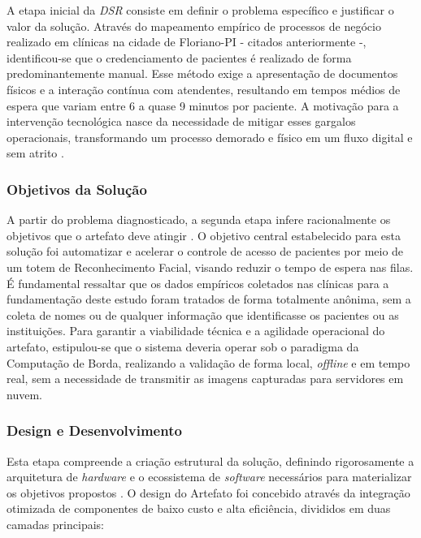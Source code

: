 A etapa inicial da \textit{DSR} consiste em definir o problema específico e justificar o valor da solução. Através do mapeamento empírico de processos de negócio realizado em clínicas na cidade de Floriano-PI - citados anteriormente -, identificou-se que o credenciamento de pacientes é realizado de forma predominantemente manual. Esse método exige a apresentação de documentos físicos e a interação contínua com atendentes, resultando em tempos médios de espera que variam entre 6 a quase 9 minutos por paciente. A motivação para a intervenção tecnológica nasce da necessidade de mitigar esses gargalos operacionais, transformando um processo demorado e físico em um fluxo digital e sem atrito \cite{peffers2007design}.

\subsubsection{Objetivos da Solução}
\label{subsubsec:objetivos-solução}

A partir do problema diagnosticado, a segunda etapa infere racionalmente os objetivos que o artefato deve atingir . O objetivo central estabelecido para esta solução foi automatizar e acelerar o controle de acesso de pacientes por meio de um totem de Reconhecimento Facial, visando reduzir o tempo de espera nas filas. É fundamental ressaltar que os dados empíricos coletados nas clínicas para a fundamentação deste estudo foram tratados de forma totalmente anônima, sem a coleta de nomes ou de qualquer informação que identificasse os pacientes ou as instituições. Para garantir a viabilidade técnica e a agilidade operacional do artefato, estipulou-se que o sistema deveria operar sob o paradigma da Computação de Borda, realizando a validação de forma local, \textit{offline} e em tempo real, sem a necessidade de transmitir as imagens capturadas para servidores em nuvem.

\subsubsection{Design e Desenvolvimento}
\label{subsubsec:design-desenvolvimento}

Esta etapa compreende a criação estrutural da solução, definindo rigorosamente a arquitetura de \textit{hardware} e o ecossistema de \textit{software} necessários para materializar os objetivos propostos . O design do Artefato foi concebido através da integração otimizada de componentes de baixo custo e alta eficiência, divididos em duas camadas principais:


